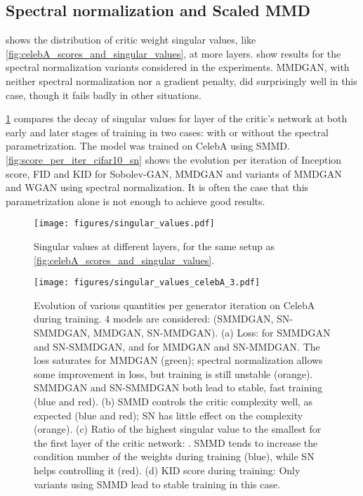 \documentclass{article}
\begin{document}
\subsection{Spectral normalization and Scaled MMD} \label{appendix:smmd_vs_sn}
 shows the distribution of critic weight singular values, like \cref{fig:celebA_scores_and_singular_values}, at more layers.
show results for the spectral normalization variants considered in the experiments.
MMDGAN, with neither spectral normalization nor a gradient penalty, did surprisingly well in this case, though it fails badly in other situations.

\cref{fig:singular_values-full} compares the decay of singular values for layer of the critic's network at both early and later stages of training in two cases: with or without the spectral parametrization. The model was trained on CelebA using SMMD.
\cref{fig:score_per_iter_cifar10_sn} shows the evolution per iteration of Inception score, FID and KID for Sobolev-GAN, MMDGAN and variants of MMDGAN and WGAN using spectral normalization. It is often the case that this parametrization alone is not enough to achieve good results.


\begin{figure}[ht]

        \centering
        \texttt{[image: figures/singular\_values.pdf]}
        \caption{Singular values at different layers, for the same setup as \cref{fig:celebA_scores_and_singular_values}.}
       \label{fig:singular_values-full}
\end{figure}

\begin{figure}[ht]
	        \centering
        \texttt{[image: figures/singular\_values\_celebA\_3.pdf]}
        \caption{Evolution of various quantities per generator iteration on CelebA during training. 4 models are considered: (SMMDGAN, SN-SMMDGAN, MMDGAN, SN-MMDGAN). (a) Loss:  for SMMDGAN and SN-SMMDGAN, and  for MMDGAN and SN-MMDGAN. The loss saturates for MMDGAN (green); spectral normalization allows some improvement in loss, but training is still unstable (orange). SMMDGAN and SN-SMMDGAN both lead to stable, fast training (blue and red). (b) SMMD controls the critic complexity well, as expected (blue and red); SN has little effect on the complexity (orange). (c) Ratio of the highest singular value to the smallest for the first layer of the critic network: . SMMD tends to increase the condition number of the weights during training (blue), while SN helps controlling it (red). (d) KID score during training: Only variants using SMMD lead to stable training in this case.}
       \label{fig:loss_celebA}
\end{figure}
\end{document}
